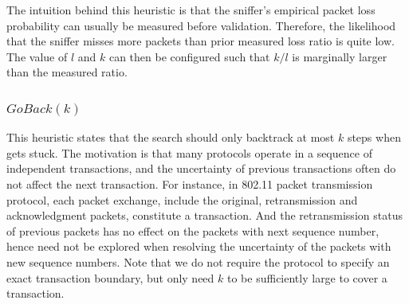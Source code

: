 The intuition behind this heuristic is that the sniffer's empirical packet loss
probability can usually be measured before validation. Therefore, the likelihood
that the sniffer misses more packets than prior measured loss ratio is quite
low. The value of $l$ and $k$ can then be configured such that $k/l$ is marginally
larger than the measured ratio.

\vspace*{-3mm}
\subsubsection{$\mathit{GoBack}(k)$}

This heuristic states that the search should only
backtrack at most $k$ steps when gets stuck.
The motivation is that many protocols operate in a sequence of independent
transactions, and the uncertainty of previous transactions often do not affect
the next transaction.
For instance, in 802.11 packet transmission protocol, each packet exchange,
include the original, retransmission and acknowledgment packets, constitute a
transaction.
And the retransmission status of previous packets has no effect on the packets
with next sequence number, hence need not be explored when resolving the
uncertainty of the packets with new sequence numbers.  Note that we do not
require the protocol to specify an exact transaction boundary, but only need $k$
to be sufficiently large to cover a transaction. 

